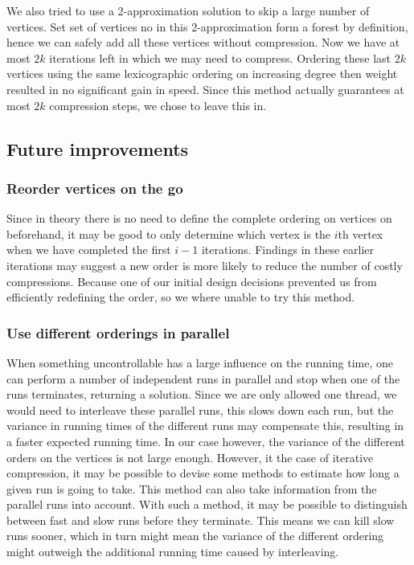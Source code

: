 We also tried to use a 2-approximation solution to skip a large number of vertices. Set set of vertices no in this
2-approximation form a forest by definition, hence we can safely add all these vertices without compression. Now we have
at most $2k$ iterations left in which we may need to compress. Ordering these last $2k$ vertices using the same
lexicographic ordering on increasing degree then weight resulted in no significant gain in speed. Since this method
actually guarantees at most $2k$ compression steps, we chose to leave this in.

\subsection{Future improvements} \subsubsection{Reorder vertices on the go}
Since in theory there is no need to define
the complete ordering on vertices on beforehand, it may be good to only determine which vertex is the $i$th vertex when
we have completed the first $i-1$ iterations. Findings in these earlier iterations may suggest a new order is more
likely to reduce the number of costly compressions. Because one of our initial design decisions prevented us from
efficiently redefining the order, so we where unable to try this method.

\subsubsection{Use different orderings in parallel}
When something uncontrollable has a large influence on the running
time, one can perform a number of independent runs in parallel and stop when one of the runs terminates, returning a
solution. Since we are only allowed one thread, we would need to interleave these parallel runs, this slows down each
run, but the variance in running times of the different runs may compensate this, resulting in a faster expected running
time. In our case however, the variance of the different orders on the vertices is not large enough. However, it the
case of iterative compression, it may be possible to devise some methods to estimate how long a given run is going to
take. This method can also take information from the parallel runs into account. With such a method, it may be possible
to distinguish between fast and slow runs before they terminate. This means we can kill slow runs sooner, which in turn
might mean the variance of the different ordering might outweigh the additional running time caused by interleaving.

